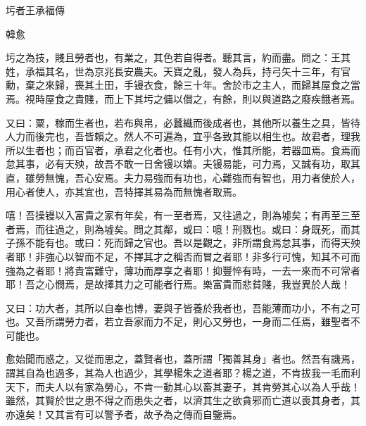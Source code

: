 圬者王承福傳

韓愈

圬之為技，賤且勞者也，有業之，其色若自得者。聽其言，約而盡。問之：王其姓，承福其名，世為京兆長安農夫。天寶之亂，發人為兵，持弓矢十三年，有官勳，棄之來歸，喪其土田，手镘衣食，餘三十年。舍於市之主人，而歸其屋食之當焉。視時屋食之貴賤，而上下其圬之傭以償之，有餘，則以與道路之廢疾餓者焉。


又曰：粟，稼而生者也，若布與帛，必蠶織而後成者也，其他所以養生之具，皆待人力而後完也，吾皆賴之。然人不可遍為，宜乎各致其能以相生也。故君者，理我所以生者也；而百官者，承君之化者也。任有小大，惟其所能，若器皿焉。食焉而怠其事，必有天殃，故吾不敢一日舍镘以嬉。夫镘易能，可力焉，又誠有功，取其直，雖勞無愧，吾心安焉。夫力易強而有功也，心難強而有智也，用力者使於人，用心者使人，亦其宜也，吾特擇其易為而無愧者取焉。


嘻！吾操镘以入富貴之家有年矣，有一至者焉，又往過之，則為墟矣；有再至三至者焉，而往過之，則為墟矣。問之其鄰，或曰：噫！刑戮也。或曰：身既死，而其子孫不能有也。或曰：死而歸之官也。吾以是觀之，非所謂食焉怠其事，而得天殃者耶！非強心以智而不足，不擇其才之稱否而冒之者耶！非多行可愧，知其不可而強為之者耶！將貴富難守，薄功而厚享之者耶！抑豐悴有時，一去一來而不可常者耶！吾之心憫焉，是故擇其力之可能者行焉。樂富貴而悲貧賤，我豈異於人哉！


又曰：功大者，其所以自奉也博，妻與子皆養於我者也，吾能薄而功小，不有之可也。又吾所謂勞力者，若立吾家而力不足，則心又勞也，一身而二任焉，雖聖者不可能也。


愈始聞而惑之，又從而思之，蓋賢者也，蓋所謂「獨善其身」者也。然吾有譏焉，謂其自為也過多，其為人也過少，其學楊朱之道者耶？楊之道，不肯拔我一毛而利天下，而夫人以有家為勞心，不肯一動其心以畜其妻子，其肯勞其心以為人乎哉！雖然，其賢於世之患不得之而患失之者，以濟其生之欲貪邪而亡道以喪其身者，其亦遠矣！又其言有可以警予者，故予為之傳而自鑒焉。
